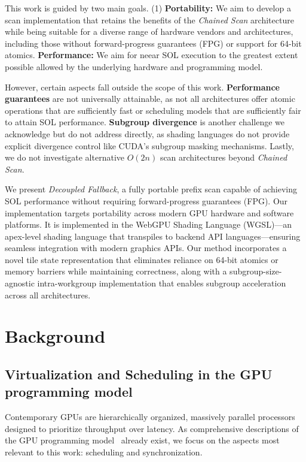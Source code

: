 \documentclass[acmsmall, manuscript, screen, review, anonymous]{acmart}
\begin{document}
This work is guided by two main goals. (1) \textbf{Portability:} We aim to develop a scan implementation that retains the benefits of the \emph{Chained Scan} architecture while being suitable for a diverse range of hardware vendors and architectures, including those without forward-progress guarantees (FPG) or support for 64-bit atomics. \textbf{Performance:} We aim for neear SOL execution to the greatest extent possible allowed by the underlying hardware and programming model.

However, certain aspects fall outside the scope of this work. \textbf{Performance guarantees} are not universally attainable, as not all architectures offer atomic operations that are sufficiently fast or scheduling models that are sufficiently fair to attain SOL performance. \textbf{Subgroup divergence} is another challenge we acknowledge but do not address directly, as shading languages do not provide explicit divergence control like CUDA's subgroup masking mechanisms. Lastly, we do not investigate alternative $O(2n)$ scan architectures beyond \emph{Chained Scan}.

We present \emph{Decoupled Fallback}, a fully portable prefix scan capable of achieving SOL performance without requiring forward-progress guarantees (FPG). Our implementation targets portability across modern GPU hardware and software platforms. It is implemented in the WebGPU Shading Language (WGSL)---an apex-level shading language that transpiles to backend API languages---ensuring seamless integration with modern graphics APIs. Our method incorporates a novel tile state representation that eliminates reliance on 64-bit atomics or memory barriers while maintaining correctness, along with a subgroup-size-agnostic intra-workgroup implementation that enables subgroup acceleration across all architectures.

\section{Background}
\subsection{Virtualization and Scheduling in the GPU programming model}
Contemporary GPUs are hierarchically organized, massively parallel processors designed to prioritize throughput over latency. As comprehensive descriptions of the GPU programming model~\cite{10.1145/1365490.1365500} already exist, we focus on the aspects most relevant to this work: scheduling and synchronization.
\end{document}
